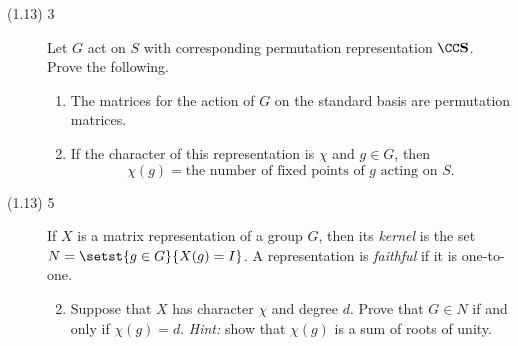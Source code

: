 \documentclass{math174}
\date{Monday, February 25}
\author{}
\begin{document}
\begin{description}
\item[(1.13) 3] Let \(G\) act on \(S\) with corresponding permutation
  representation \(\CC \mathbf S\).  Prove the following.

  \begin{enumerate}
  \item The matrices for the action of \(G\) on the standard basis are
    permutation matrices.

    \begin{solution}

    \end{solution}

  \item If the character of this representation is \(\chi\) and
    \(g \in G\), then
    \[
      \chi(g) = \text{the number of fixed points of \(g\) acting on
        \(S\)}.
    \]

    \begin{solution}

    \end{solution}
  \end{enumerate}

\item[(1.13) 5] If \(X\) is a matrix representation of a group \(G\),
  then its \emph{kernel} is the set \(N = \setst{g \in G}{X(g) = I}\).
  A representation is \emph{faithful} if it is one-to-one.
  \begin{enumerate} \setcounter{enumi}{1}
  \item Suppose that \(X\) has character \(\chi\) and degree \(d\).
    Prove that \(G \in N\) if and only if \(\chi(g) = d\).
    \emph{Hint:} show that \(\chi(g)\) is a sum of roots of unity.

    \begin{solution}

    \end{solution}
  \end{enumerate}
\end{description}
\end{document}
